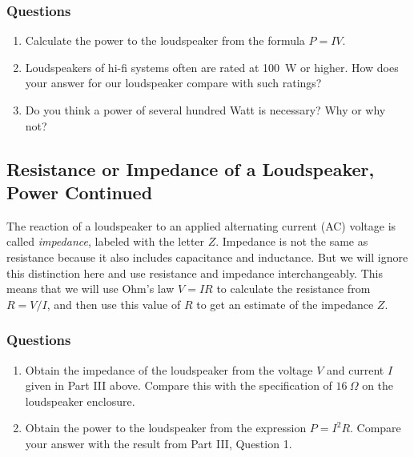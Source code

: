 \documentclass[11pt]{NSF}
\def\ben{\begin{enumerate}}
\def\een{\end{enumerate}}
\begin{document}
\subsubsection*{Questions}
\ben
\item 
Calculate the power to the loudspeaker from the formula $P = IV$.

\item 
Loudspeakers of hi-fi systems often are rated at 100~W or higher. 
How does your answer for our loudspeaker compare with such ratings?

\item 
Do you think a power of several hundred Watt is necessary? Why or why not?
\een

\subsection{Resistance or Impedance of a Loudspeaker, Power Continued}

The reaction of a loudspeaker to an applied alternating current (AC) 
voltage is called {\em impedance}, labeled with the letter $Z$. 
Impedance is not the same as resistance because it also includes 
capacitance and inductance. 
But we will ignore this distinction here and use resistance and impedance
interchangeably.
This means that we will use Ohm's law $V=IR$ to calculate the
resistance from $R=V/I$, and then use this value of $R$ to get an
estimate of the impedance $Z$.

\subsubsection*{Questions}
\ben
\item
Obtain the impedance of the loudspeaker from the voltage $V$ and 
current $I$ given in Part III above.
Compare this with the specification of $16~\Omega$ on the loudspeaker 
enclosure.

\item
Obtain the power to the loudspeaker from the expression $P = I^2 R$.
Compare your answer with the result from Part III, Question 1.

\een


\end{document}
